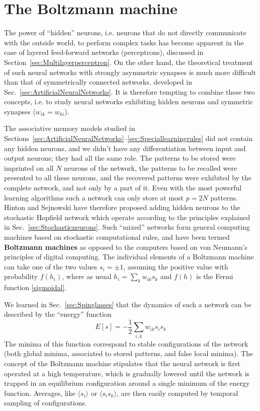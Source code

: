 \section{The Boltzmann machine}
The power of ``hidden'' neurons, i.e. neurons that do not directly communicate with the outside world, to perform complex tasks has become apparent in the case of layered feed-forward networks (perceptrons), discussed in Section~\ref{sec:Multilayerperceptron}. On the other hand, the theoretical treatment of such neural networks with strongly asymmetric synapses is much more difficult than that of symmetrically connected networks, developed in Sec.~\ref{sec:ArtificialNeuralNetworks}. It is therefore tempting to combine these two concepts, i.e. to study neural networks exhibiting hidden neurons and symmetric synapses ($w_{ik}=w_{ki}$).

The associative memory models studied in Sections~\ref{sec:ArtificialNeuralNetworks}--\ref{sec:Speciallearningrules} did not contain any hidden neurons, and we didn't have any differentiation between input and output neurons; they had all the same role. The patterns to be stored were imprinted on all $N$ neurons of the network, the patterns to be recalled were presented to all these neurons, and the recovered patterns were exhibited by the complete network, and not only by a part of it. Even with the most powerful learning algorithms such a network can only store at most $p=2N$ patterns. Hinton and Sejnowski have therefore proposed adding hidden neurons to the stochastic Hopfield network which operate according to the principles explained in Sec.~\ref{sec:Stochasticneurons}. Such ``mixed'' networks form general computing machines based on stochastic computational rules, and have been termed \textbf{Boltzmann machines} as opposed to the computers based on von Neumann's principles of digital computing. The individual elements of a Boltzmann machine can take one of the two values $s_i=\pm1$, assuming the positive value with probability $f(h_i)$, where as usual $h_i=\sum_kw_{ik}s_k$ and $f(h)$ is the Fermi function \eqref{sigmoidal}.

We learned in Sec.~\ref{sec:Spinglasses} that the dynamics of such a network can be described by the ``energy'' function
\begin{equation}\label{BMEnergy}
E[s]=-\frac{1}{2}\sum_{i,k}w_{ik}s_is_k
\end{equation}
The minima of this function correspond to stable configurations of the network (both global minima, associated to stored patterns, and false local minima). The concept of the Boltzmann machine stipulates that the neural network is first operated at a high temperature, which is gradually lowered until the network is trapped in an equilibrium configuration around a single minimum of the energy function. Averages, like $\langle s_i\rangle$ or $\langle s_is_k\rangle$, are then easily computed by temporal sampling of configurations.

